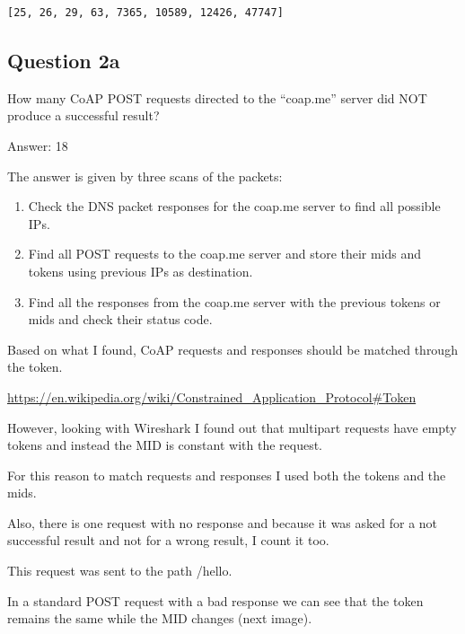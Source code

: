\documentclass[11pt]{article}
\makeatletter
\providecommand{\tightlist}{%
      \setlength{\itemsep}{0pt}\setlength{\parskip}{0pt}}
\newcommand{\boxspacing}{\kern\kvtcb@left@rule\kern\kvtcb@boxsep}
\newcommand{\prompt}[4]{
        {\ttfamily\llap{{\color{#2}[#3]:\hspace{3pt}#4}}\vspace{-\baselineskip}}
    }
\makeatother
\begin{document}
            \begin{tcolorbox}[breakable, size=fbox, boxrule=.5pt, pad at break*=1mm, opacityfill=0]
\prompt{Out}{outcolor}{7}{\boxspacing}
\begin{Verbatim}[commandchars=\\\{\}]
[25, 26, 29, 63, 7365, 10589, 12426, 47747]
\end{Verbatim}
\end{tcolorbox}
        
    \hypertarget{question-2a}{%
\subsection{Question 2a}\label{question-2a}}

How many CoAP POST requests directed to the ``coap.me'' server did NOT
produce a successful result?

Answer: 18

The answer is given by three scans of the packets:

\begin{enumerate}
\def\labelenumi{\arabic{enumi}.}
\tightlist
\item
  Check the DNS packet responses for the coap.me server to find all
  possible IPs.
\item
  Find all POST requests to the coap.me server and store their mids and
  tokens using previous IPs as destination.
\item
  Find all the responses from the coap.me server with the previous
  tokens or mids and check their status code.
\end{enumerate}

Based on what I found, CoAP requests and responses should be matched
through the token.

\url{https://en.wikipedia.org/wiki/Constrained_Application_Protocol\#Token}

However, looking with Wireshark I found out that multipart requests have
empty tokens and instead the MID is constant with the request.

For this reason to match requests and responses I used both the tokens
and the mids.

Also, there is one request with no response and because it was asked for
a not successful result and not for a wrong result, I count it too.

This request was sent to the path /hello.

    In a standard POST request with a bad response we can see that the token
remains the same while the MID changes (next image).
\end{document}
